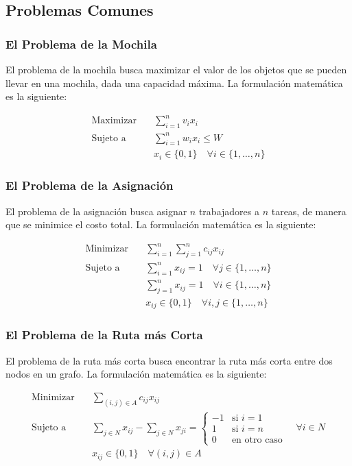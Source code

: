 \documentclass{article}
\begin{document}
\subsection{Problemas Comunes}
\subsubsection{El Problema de la Mochila}

El problema de la mochila busca maximizar el valor de los objetos que se pueden llevar en una mochila, dada una capacidad máxima. La formulación matemática es la siguiente:

\begin{align*}
    \text{Maximizar} \quad & \sum_{i=1}^{n} v_i x_i \\
    \text{Sujeto a} \quad & \sum_{i=1}^{n} w_i x_i \leq W \\
    & x_i \in \{0, 1\} \quad \forall i \in \{1, \ldots, n\}
\end{align*}

\subsubsection{El Problema de la Asignación}

El problema de la asignación busca asignar $n$ trabajadores a $n$ tareas, de manera que se minimice el costo total. La formulación matemática es la siguiente:

\begin{align*}
    \text{Minimizar} \quad & \sum_{i=1}^{n} \sum_{j=1}^{n} c_{ij} x_{ij} \\
    \text{Sujeto a} \quad & \sum_{i=1}^{n} x_{ij} = 1 \quad \forall j \in \{1, \ldots, n\} \\
    & \sum_{j=1}^{n} x_{ij} = 1 \quad \forall i \in \{1, \ldots, n\} \\
    & x_{ij} \in \{0, 1\} \quad \forall i, j \in \{1, \ldots, n\}
\end{align*}

\subsubsection{El Problema de la Ruta más Corta}

El problema de la ruta más corta busca encontrar la ruta más corta entre dos nodos en un grafo. La formulación matemática es la siguiente:

\begin{align*}
    \text{Minimizar} \quad & \sum_{(i, j) \in A} c_{ij} x_{ij} \\
    \text{Sujeto a} \quad & \sum_{j \in N} x_{ij} - \sum_{j \in N} x_{ji} = 
    \begin{cases}
        -1 & \text{si } i = 1 \\
        1 & \text{si } i = n \\
        0 & \text{en otro caso}
    \end{cases} \quad \forall i \in N \\
    & x_{ij} \in \{0, 1\} \quad \forall (i, j) \in A
\end{align*}
\end{document}
